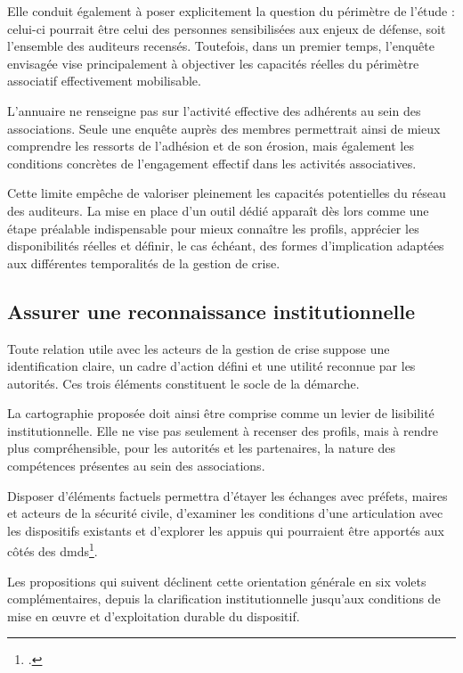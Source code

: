 Elle conduit également à poser explicitement la question du périmètre de l'étude : celui-ci pourrait être celui des personnes sensibilisées aux enjeux de défense, soit l'ensemble des auditeurs recensés. Toutefois, dans un premier temps, l'enquête envisagée vise principalement à objectiver les capacités réelles du périmètre associatif effectivement mobilisable.

L'annuaire ne renseigne pas sur l'activité effective des adhérents au sein des associations. Seule une enquête auprès des membres permettrait ainsi de mieux comprendre les ressorts de l'adhésion et de son érosion, mais également les conditions concrètes de l'engagement effectif dans les activités associatives.

Cette limite empêche de valoriser pleinement les capacités potentielles du réseau des auditeurs. La mise en place d'un outil dédié apparaît dès lors comme une étape préalable indispensable pour mieux connaître les profils, apprécier les disponibilités réelles et définir, le cas échéant, des formes d'implication adaptées aux différentes temporalités de la gestion de crise.

\subsection{Assurer une reconnaissance institutionnelle}

Toute relation utile avec les acteurs de la gestion de crise suppose une identification claire, un cadre d'action défini et une utilité reconnue par les autorités. Ces trois éléments constituent le socle de la démarche.

La cartographie proposée doit ainsi être comprise comme un levier de lisibilité institutionnelle. Elle ne vise pas seulement à recenser des profils, mais à rendre plus compréhensible, pour les autorités et les partenaires, la nature des compétences présentes au sein des associations.

Disposer d'éléments factuels permettra d'étayer les échanges avec préfets, maires et acteurs de la sécurité civile, d'examiner les conditions d'une articulation avec les dispositifs existants et d'explorer les appuis qui pourraient être apportés aux côtés des \glspl{dmd}\footcite{DMD_def_missions}.


Les propositions qui suivent déclinent cette orientation générale en six volets complémentaires, depuis la clarification institutionnelle jusqu'aux conditions de mise en \oe{}uvre et d'exploitation durable du dispositif.

